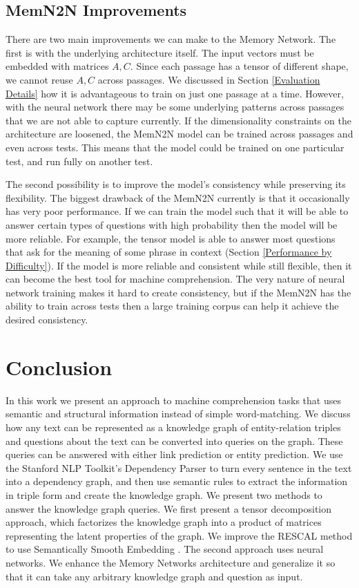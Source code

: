 \documentclass[pageno]{final_paper}
\begin{document}
\subsection{MemN2N Improvements}
\label{MemN2N Improvements}

There are two main improvements we can make to the Memory Network. The first is
with the underlying architecture itself. The input vectors must be embedded with
matrices $A,C$. Since each passage has a tensor of different shape, we cannot
reuse $A,C$ across passages. We discussed in Section \ref{Evaluation Details}
how it is advantageous to train on just one passage at a time. However, with the
neural network there may be some underlying patterns across passages that we are
not able to capture currently. If the dimensionality constraints on the
architecture are loosened, the MemN2N model can be trained across passages and
even across tests. This means that the model could be trained on one particular
test, and run fully on another test.

The second possibility is to improve the model's consistency while preserving
its flexibility. The biggest drawback of the MemN2N currently is that it
occasionally has very poor performance. If we can train the model such that it
will be able to answer certain types of questions with high probability then the
model will be more reliable. For example, the tensor model is able to answer
most questions that ask for the meaning of some phrase in context (Section
\ref{Performance by Difficulty}). If the model is more reliable and consistent
while still flexible, then it can become the best tool for machine
comprehension. The very nature of neural network training makes it hard to
create consistency, but if the MemN2N has the ability to train across tests then
a large training corpus can help it achieve the desired consistency.

\section{Conclusion}
\label{Conclusion}

In this work we present an approach to machine comprehension tasks that uses
semantic and structural information instead of simple word-matching. We discuss
how any text can be represented as a knowledge graph of entity-relation triples
and questions about the text can be converted into queries on the graph. These
queries can be answered with either link prediction or entity prediction. We use
the Stanford NLP Toolkit's Dependency Parser \cite{Manning2014, Chen2014} to
turn every sentence in the text into a dependency graph, and then use semantic
rules to extract the information in triple form and create the knowledge graph.
We present two methods to answer the knowledge graph queries. We first present a
tensor decomposition approach, which factorizes the knowledge graph into a
product of matrices representing the latent properties of the graph. We improve
the RESCAL \cite{Nickel2011, Chang2014} method to use Semantically Smooth
Embedding \cite{Guo2015}. The second approach uses neural networks. We enhance
the Memory Networks \cite{Weston2015a, Sukhbaatar2015} architecture and
generalize it so that it can take any arbitrary knowledge graph and question
as input.
\end{document}
